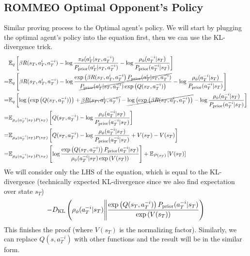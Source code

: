 \subsection{ROMMEO Optimal Opponent's Policy}
\label{appx:chap3-ROMMEO-opponent-last-time}
Similar proving process to the Optimal agent's policy. We will start by plugging the optimal agent's policy into the equation first, then we can use the KL-divergence trick.
\begin{equation*}
\begin{aligned}
    &\mathbb{E}_{q}\left[  \beta R(s_T, a^i_T, a^{-i}_T)  - \log \frac{\pi_{\theta}(a^i_T | s_T, a^{-i}_T)}{P_{\text{prior}}(a^i_T | s_T, a^{-i}_T) } - \log \frac{\rho_{\phi}(a^{-i}_T | s_T)}{P_{\text{prior}}(a^{-i}_T | s_T)}  \right] \\ 
    =& \mathbb{E}_{q}\left[  \beta R(s_T, a^i_T, a^{-i}_T)  - \log \frac{\exp \left( \beta R(s_T, a^i_T, a^{-i}_T \right)\cancel{P_{\text{prior}}(a^i_T | s_T, a^{-i}_T)}}{\cancel{P_{\text{prior}}(a^i_T | s_T, a^{-i}_T)} \exp\left( Q(s_T, a^{-i}_T) \right)} - \log \frac{\rho_{\phi}(a^{-i}_T | s_T)}{P_{\text{prior}}(a^{-i}_T | s_T)}  \right] \\ 
    =& \mathbb{E}_{q}\left[  \log\left( \exp\left( Q(s_T, a^{-i}_T) \right) \right) + \cancel{\beta R(s_T, a^i_T, a^{-i}_T)}  - \cancel{\log \left( \exp \left( \beta R(s_T, a^i_T, a^{-i}_T \right) \right)} - \log \frac{\rho_{\phi}(a^{-i}_T | s_T)}{P_{\text{prior}}(a^{-i}_T | s_T)}  \right] \\
    =& \mathbb{E}_{ \rho_{\phi}(a^{-i}_T | s_T) P(s_T)}\left[  Q(s_T, a^{-i}_T) - \log \frac{\rho_{\phi}(a^{-i}_T | s_T)}{P_{\text{prior}}(a^{-i}_T | s_T)}  \right] \\
    =& \mathbb{E}_{ \rho_{\phi}(a^{-i}_T | s_T) P(s_T)}\left[  Q(s_T, a^{-i}_T) - \log \frac{\rho_{\phi}(a^{-i}_T | s_T)}{P_{\text{prior}}(a^{-i}_T | s_T)} + V(s_T) - V(s_T) \right] \\
    =& \mathbb{E}_{ \rho_{\phi}(a^{-i}_T | s_T) P(s_T)}\left[  \log \frac{\exp\left( Q(s_T, a^{-i}_T) \right)P_{\text{prior}}(a^{-i}_T | s_T)}{\rho_{\phi}(a^{-i}_T | s_T)\exp\left( V(s_T) \right)} \right] + \mathbb{E}_{P(s_T)}\left[ V(s_T) \right] \\
\end{aligned}    
\end{equation*}
We will consider only the LHS of the equation, which is equal to the KL-divergence (technically expected KL-divergence since we also find expectation over state $s_T$)
\begin{equation*}
    - D_{\mathrm{KL}}\left( \rho_{\phi}(a^{-i}_T | s_T) \Bigg\|  \frac{ \exp\left( Q(s_T, a^{-i}_T) \right)P_{\text{prior}}(a^{-i}_T | s_T) }{\exp\left( V(s_T) \right)} \right)
\end{equation*}
This finishes the proof (where $V(s_T)$ is the normalizing factor). Similarly, we can replace $Q(s, a^{-i}_T)$ with other functions and the result will be in the similar form.